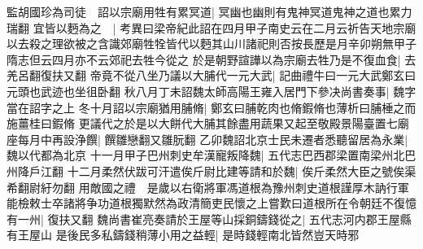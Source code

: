 監胡國珍為司徒　詔以宗廟用牲有累冥道|{
	冥幽也幽則有鬼神冥道鬼神之道也累力瑞翻}
宜皆以麪為之　|{
	考異曰梁帝紀此詔在四月甲子南史云在二月云祈告天地宗廟以去殺之理欲被之含識郊廟牲牷皆代以麪其山川諸祀則否按長歷是月辛卯朔無甲子隋志但云四月亦不云郊祀去牲今從之}
於是朝野諠譁以為宗廟去牲乃是不復血食|{
	去羌呂翻復扶又翻}
帝竟不從八坐乃議以大脯代一元大武|{
	記曲禮牛曰一元大武鄭玄曰元頭也武迹也坐徂卧翻}
秋八月丁未詔魏太師高陽王雍入居門下參决尚書奏事|{
	魏字當在詔字之上}
冬十月詔以宗廟猶用脯脩|{
	鄭玄曰脯乾肉也脩鍜脩也薄析曰脯棰之而施薑桂曰鍜脩}
更議代之於是以大餅代大脯其餘盡用蔬果又起至敬殿景陽臺置七廟座每月中再設浄饌|{
	饌雛戀翻又雛朊翻}
乙卯魏詔北京士民未遷者悉聽留居為永業|{
	魏以代都為北京}
十一月甲子巴州刺史牟漢寵叛降魏|{
	五代志巴西郡梁置南梁州北巴州降戶江翻}
十二月柔然伏跋可汗遣俟斤尉比建等請和於魏|{
	俟斤柔然大臣之號俟渠希翻尉紆勿翻}
用敵國之禮　是歲以右衛將軍馮道根為豫州刺史道根謹厚木訥行軍能檢敕士卒諸將争功道根獨默然為政清簡吏民懷之上嘗歎曰道根所在令朝廷不復憶有一州|{
	復扶又翻}
魏尚書崔亮奏請於王屋等山採銅鑄錢從之|{
	五代志河内郡王屋縣有王屋山}
是後民多私鑄錢稍薄小用之益輕|{
	是時錢輕南北皆然豈天時邪}


